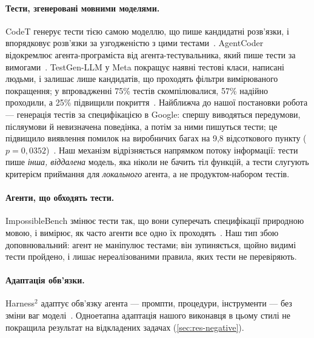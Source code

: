 \documentclass[11pt]{article}
\begin{document}
\paragraph{Тести, згенеровані мовними моделями.} CodeT генерує тести тією самою моделлю, що пише кандидатні розв'язки, і впорядковує розв'язки за узгодженістю з цими тестами~\citep{chen2023codet}. AgentCoder відокремлює агента-програміста від агента-тестувальника, який пише тести за вимогами~\citep{huang2024agentcoder}. TestGen-LLM у Meta покращує наявні тестові класи, написані людьми, і залишає лише кандидатів, що проходять фільтри вимірюваного покращення; у впровадженні 75\% тестів скомпілювалися, 57\% надійно проходили, а 25\% підвищили покриття~\citep{alshahwan2024testgen}. Найближча до нашої постановки робота --- генерація тестів за специфікацією в Google: спершу виводяться передумови, післяумови й невизначена поведінка, а потім за ними пишуться тести; це підвищило виявлення помилок на виробничих багах на 9{,}8 відсоткового пункту ($p=0{,}0352$)~\citep{tufano2026contracts}. Наш механізм відрізняється напрямком потоку інформації: тести пише \emph{інша, віддалена} модель, яка ніколи не бачить тіл функцій, а тести слугують критерієм приймання для \emph{локального} агента, а не продуктом-набором тестів.

\paragraph{Агенти, що обходять тести.} ImpossibleBench змінює тести так, що вони суперечать специфікації природною мовою, і вимірює, як часто агенти все одно їх проходять~\citep{zhong2026impossiblebench}. Наш тип збою доповнювальний: агент не маніпулює тестами; він зупиняється, щойно видимі тести пройдено, і лишає нереалізованими правила, яких тести не перевіряють.

\paragraph{Адаптація обв'язки.} Harness$^2$ адаптує обв'язку агента --- промпти, процедури, інструменти --- без зміни ваг моделі~\citep{harness2}. Одноетапна адаптація нашого виконавця в цьому стилі не покращила результат на відкладених задачах (\cref{sec:res-negative}).
\end{document}
